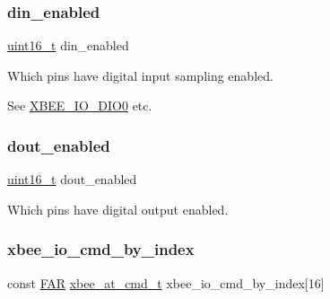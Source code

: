 \subsubsection{\texorpdfstring{din\+\_\+enabled}{din\_enabled}}
{\footnotesize\ttfamily \hyperlink{group__hal__dos_ga5a8b2dc9e45a9ee81a94ef304fb62505}{uint16\+\_\+t} din\+\_\+enabled}



Which pins have digital input sampling enabled. 

See \hyperlink{group__xbee__io_gaf01ab2d51afb8e360ade1ec5ceb15f0c}{X\+B\+E\+E\+\_\+\+I\+O\+\_\+\+D\+I\+O0} etc. \mbox{\label{group__xbee__io_gab9c5cc4d30d476f26698c96f9aa329fe}} 
\subsubsection{\texorpdfstring{dout\+\_\+enabled}{dout\_enabled}}
{\footnotesize\ttfamily \hyperlink{group__hal__dos_ga5a8b2dc9e45a9ee81a94ef304fb62505}{uint16\+\_\+t} dout\+\_\+enabled}



Which pins have digital output enabled. 

\mbox{\label{group__xbee__io_gae37c4ac030a185af04ce61671b8acfbd}} 
\subsubsection{\texorpdfstring{xbee\+\_\+io\+\_\+cmd\+\_\+by\+\_\+index}{xbee\_io\_cmd\_by\_index}}
{\footnotesize\ttfamily const \hyperlink{group__hal_gaef060b3456fdcc093a7210a762d5f2ed}{F\+AR} \hyperlink{unionxbee__at__cmd__t}{xbee\+\_\+at\+\_\+cmd\+\_\+t} xbee\+\_\+io\+\_\+cmd\+\_\+by\+\_\+index\mbox{[}16\mbox{]}}

